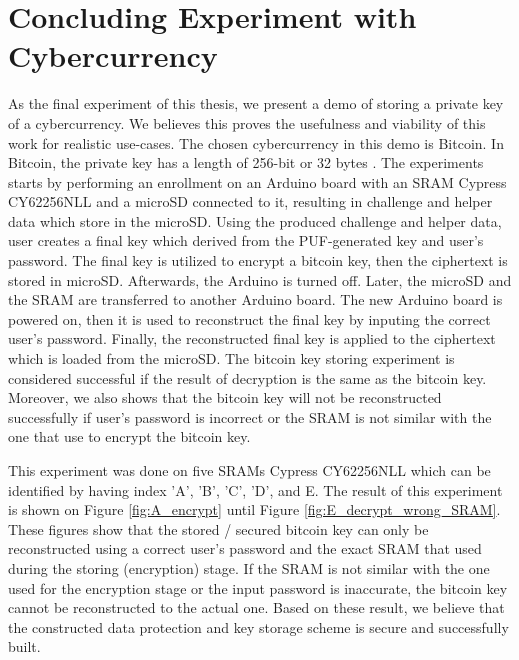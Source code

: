 \section{Concluding Experiment with Cybercurrency}
As the final experiment of this thesis, we present a demo of storing a private key of a cybercurrency. We believes this proves the usefulness and viability of this work for realistic use-cases. The chosen cybercurrency in this demo is Bitcoin. In Bitcoin, the private key has a length of 256-bit or 32 bytes \cite{bitcoin_key}. The experiments starts by performing an enrollment on an Arduino board with an SRAM Cypress CY62256NLL and a microSD connected to it, resulting in challenge and helper data which store in the microSD. Using the produced challenge and helper data, user creates a final key which derived from the PUF-generated key and user's password. The final key is utilized to encrypt a bitcoin key, then the ciphertext is stored in microSD. Afterwards, the Arduino is turned off.
Later, the microSD and the SRAM are transferred to another Arduino board. The new Arduino board is powered on, then it is used to reconstruct the final key by inputing the correct user's password. Finally, the reconstructed final key is applied to the ciphertext which is loaded from the microSD. The bitcoin key storing experiment is considered successful if the result of decryption is the same as the bitcoin key.
Moreover, we also shows that the bitcoin key will not be reconstructed successfully if user's password is incorrect or the SRAM is not similar with the one that use to encrypt the bitcoin key.

This experiment was done on five SRAMs Cypress CY62256NLL which can be identified by having index 'A', 'B', 'C', 'D', and E.
The result of this experiment is shown on Figure \ref{fig:A_encrypt} until Figure \ref{fig:E_decrypt_wrong_SRAM}. These figures show that the stored / secured bitcoin key can only be reconstructed using a correct user's password and the exact SRAM that used during the storing (encryption) stage. If the SRAM is not similar with the one used for the encryption stage or the input password is inaccurate, the bitcoin key cannot be reconstructed to the actual one.
Based on these result, we believe that the constructed data protection and key storage scheme is secure and successfully built.

